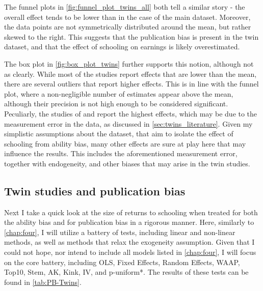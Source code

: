 The funnel plots in \autoref{fig:funnel_plot_twins_all} both tell a similar story - the overall effect tends to be lower than in the case of the main dataset. Moreover, the data points are not symmetrically distributed around the mean, but rather skewed to the right. This suggests that the publication bias is present in the twin dataset, and that the effect of schooling on earnings is likely overestimated.


The box plot in \autoref{fig:box_plot_twins} further supports this notion, although not as clearly. While most of the studies report effects that are lower than the mean, there are several outliers that report higher effects. This is in line with the funnel plot, where a non-negligible number of estimates appear above the mean, although their precision is not high enough to be considered significant. Peculiarly, the studies of \cite{ashenfelter1994estimates} and \cite{ashenfelter1998income} report the highest effects, which may be due to the measurement error in the data, as discussed in \autoref{sec:twins_literature}. Given my simplistic assumptions about the dataset, that aim to isolate the effect of schooling from ability bias, many other effects are sure at play here that may influence the results. This includes the aforementioned measurement error, together with endogeneity, and other biases that may arise in the twin studies.


\subsection*{Twin studies and publication bias}

Next I take a quick look at the size of returns to schooling when treated for both the ability bias and for publication bias in a rigorous manner. Here, similarly to \autoref{chap:four}, I will utilize a battery of tests, including linear and non-linear methods, as well as methods that relax the exogeneity assumption. Given that I could not hope, nor intend to include all models listed in \autoref{chap:four}, I will focus on the core battery, including OLS, Fixed Effects, Random Effects, WAAP, Top10, Stem, AK, Kink, IV, and p-uniform*. The results of these tests can be found in \autoref{tab:PB-Twins}.

